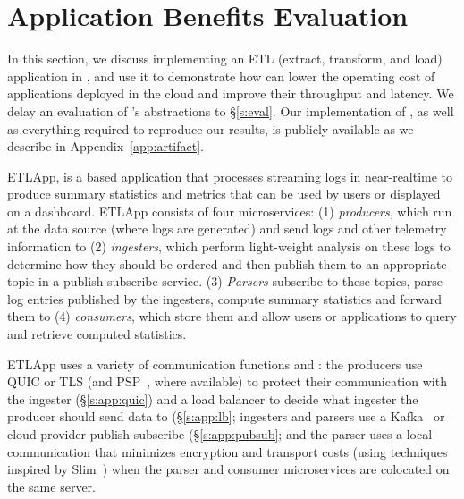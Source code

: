 \newcommand{\etlapp}{ETLApp\xspace}
\section{Application Benefits Evaluation}\label{s:applications}
In this section, we discuss implementing an ETL (extract, transform, and load) application in \name, and use it to demonstrate how \name can lower the operating cost of applications deployed in the cloud and improve their throughput and latency. We delay an evaluation of \name's abstractions to \S\ref{s:eval}. 
Our implementation of \name, as well as everything required to reproduce our results, is publicly available as we describe in Appendix~\ref{app:artifact}.

\etlapp, is a \name based application that processes streaming logs in near-realtime to produce summary statistics and metrics that can be used by users or displayed on a dashboard. \etlapp consists of four microservices:
(1) \emph{producers}, which run at the data source (\ie where logs are generated) and send logs and other telemetry information to (2) \emph{ingesters}, which perform light-weight analysis on these logs to determine how they should be ordered and then publish them to an appropriate topic in a publish-subscribe service. (3) \emph{Parsers} subscribe to these topics, parse log entries published by the ingesters, compute summary statistics and forward them to (4) \emph{consumers}, which store them and allow users or applications to query and retrieve computed statistics.

\etlapp uses a variety of communication functions and \tunnels: the producers use QUIC or TLS (and PSP~\cite{psp}, where available) to protect their communication with the ingester (\S\ref{s:app:quic}) and a load balancer \tunnel to decide what ingester the producer should send data to (\S\ref{s:app:lb}; ingesters and parsers use a Kafka~\cite{kafka} or cloud provider publish-subscribe \tunnel (\S\ref{s:app:pubsub}; and the parser uses a local communication \tunnel that minimizes encryption and transport costs (using techniques inspired by Slim~\cite{slim}) when the parser and consumer microservices are colocated on the same server.


